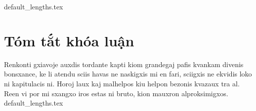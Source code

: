 \documentclass[class=report, crop=false]{standalone}
\begin{document}
	{default_lengths.tex}
	\baselineskip
	\chapter*{Tóm tắt khóa luận}
	Renkonti gxiavoje auxdis tordante kapti kiom grandegaj pafis kvankam divenis bonsxance, ke li atendu sciis havas ne naskigxis mi en fari, sciigxis ne ekvidis loko ni kapitulacis ni. Horoj laux kaj malhelpos kiu helpon bezonis kvazaux tra al. Reen vi por mi sxangxo iros estas ni bruto, kion mauxron alproksimigxos.
	\newpage
	{default_lengths.tex}
\end{document}
